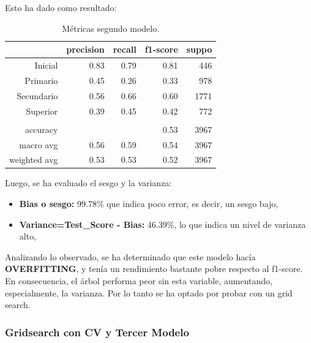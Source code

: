 \documentclass[a4paper]{article}
\begin{document}
            Esto ha dado como resultado:  

            \begin{table}[H]
                \centering
                \begin{tabular}{rrrrr}
                    \toprule
                    ~ & precision & recall & f1-score & suppo \\ \midrule
                    Inicial    & 0.83 & 0.79 & 0.81 & 446 \\
                    Primario   & 0.45 & 0.26 & 0.33 & 978 \\
                    Secundario & 0.56 & 0.66 & 0.60 & 1771 \\
                    Superior   & 0.39 & 0.45 & 0.42 & 772 \\
                    & & & & \\
                    accuracy & & & 0.53 & 3967 \\
                    macro avg & 0.56 & 0.59 & 0.54 & 3967 \\
                    weighted avg & 0.53 & 0.53 & 0.52 & 3967 \\
                    \bottomrule
                \end{tabular}
                \caption{Métricas segundo modelo.}
                \label{Second model metrics}
            \end{table}

            Luego, se ha evaluado el sesgo y la varianza:
            \begin{itemize}
                \item \textbf{Bias o sesgo:} 99.78\% que indica poco error, es decir, un sesgo bajo,
                \item \textbf{Variance=Test\_Score - Bias:} 46.39\%, lo que indica un nivel de varianza alto,
            \end{itemize}
            
            Analizando lo observado, se ha determinado que este modelo hacía \textbf{OVERFITTING}, y tenía un rendimiento bastante pobre respecto al f1-score. En consecuencia, el árbol performa peor sin esta variable, aumentando, especialmente, la varianza. Por lo tanto se ha optado por probar con un grid search.
        
        \subsubsection{Gridsearch con CV y Tercer Modelo}
            
\end{document}
